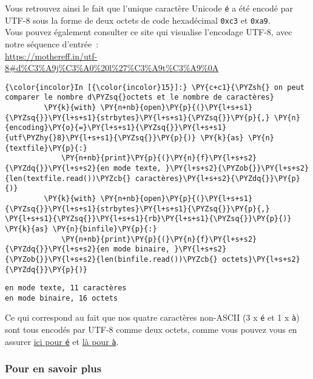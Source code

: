     Vous retrouvez ainsi le fait que l'unique caractère Unicode \texttt{é} a
été encodé par UTF-8 sous la forme de deux octets de code hexadécimal
\texttt{0xc3} et \texttt{0xa9}.\\

    Vous pouvez également consulter ce site qui visualise l'encodage UTF-8,
avec notre séquence d'entrée~:\\

\href{https://mothereff.in/utf-8\#d\%C3\%A9j\%C3\%A0\%20l\%27\%C3\%A9t\%C3\%A9\%0A}{https://mothereff.in/utf-8\#d\%C3\%A9j\%C3\%A0\%20l\%27\%C3\%A9t\%C3\%A9\%0A}

    \begin{Verbatim}[commandchars=\\\{\}]
{\color{incolor}In [{\color{incolor}15}]:} \PY{c+c1}{\PYZsh{} on peut comparer le nombre d\PYZsq{}octets et le nombre de caractères}
         \PY{k}{with} \PY{n+nb}{open}\PY{p}{(}\PY{l+s+s1}{\PYZsq{}}\PY{l+s+s1}{strbytes}\PY{l+s+s1}{\PYZsq{}}\PY{p}{,} \PY{n}{encoding}\PY{o}{=}\PY{l+s+s1}{\PYZsq{}}\PY{l+s+s1}{utf\PYZhy{}8}\PY{l+s+s1}{\PYZsq{}}\PY{p}{)} \PY{k}{as} \PY{n}{textfile}\PY{p}{:}
             \PY{n+nb}{print}\PY{p}{(}\PY{n}{f}\PY{l+s+s2}{\PYZdq{}}\PY{l+s+s2}{en mode texte, }\PY{l+s+s2}{\PYZob{}}\PY{l+s+s2}{len(textfile.read())\PYZcb{} caractères}\PY{l+s+s2}{\PYZdq{}}\PY{p}{)}
         \PY{k}{with} \PY{n+nb}{open}\PY{p}{(}\PY{l+s+s1}{\PYZsq{}}\PY{l+s+s1}{strbytes}\PY{l+s+s1}{\PYZsq{}}\PY{p}{,} \PY{l+s+s1}{\PYZsq{}}\PY{l+s+s1}{rb}\PY{l+s+s1}{\PYZsq{}}\PY{p}{)} \PY{k}{as} \PY{n}{binfile}\PY{p}{:}
             \PY{n+nb}{print}\PY{p}{(}\PY{n}{f}\PY{l+s+s2}{\PYZdq{}}\PY{l+s+s2}{en mode binaire, }\PY{l+s+s2}{\PYZob{}}\PY{l+s+s2}{len(binfile.read())\PYZcb{} octets}\PY{l+s+s2}{\PYZdq{}}\PY{p}{)}
\end{Verbatim}


    \begin{Verbatim}[commandchars=\\\{\}]
en mode texte, 11 caractères
en mode binaire, 16 octets

    \end{Verbatim}

    Ce qui correspond au fait que nos quatre caractères non-ASCII (3 x
\texttt{é} et 1 x \texttt{à}) sont tous encodés par UTF-8 comme deux
octets, comme vous pouvez vous en assurer
\href{https://mothereff.in/utf-8\#\%C3\%A9}{ici pour \texttt{é}} et
\href{https://mothereff.in/utf-8\#\%C3\%A0}{là pour \texttt{à}}.

    \hypertarget{pour-en-savoir-plus}{%
\subsubsection{Pour en savoir plus}\label{pour-en-savoir-plus}}


